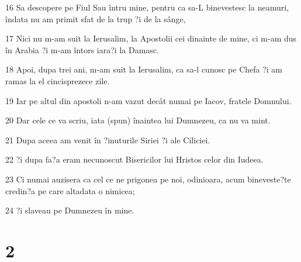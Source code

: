 \par 16 Sa descopere pe Fiul Sau întru mine, pentru ca sa-L binevestesc la neamuri, îndata nu am primit sfat de la trup ?i de la sânge,
\par 17 Nici nu m-am suit la Ierusalim, la Apostolii cei dinainte de mine, ci m-am dus în Arabia ?i m-am întors iara?i la Damasc.
\par 18 Apoi, dupa trei ani, m-am suit la Ierusalim, ca sa-l cunosc pe Chefa ?i am ramas la el cincisprezece zile.
\par 19 Iar pe altul din apostoli n-am vazut decât numai pe Iacov, fratele Domnului.
\par 20 Dar cele ce va scriu, iata (spun) înaintea lui Dumnezeu, ca nu va mint.
\par 21 Dupa aceea am venit în ?inuturile Siriei ?i ale Ciliciei.
\par 22 ?i dupa fa?a eram necunoscut Bisericilor lui Hristos celor din Iudeea.
\par 23 Ci numai auzisera ca cel ce ne prigonea pe noi, odinioara, acum bineveste?te credin?a pe care altadata o nimicea;
\par 24 ?i slaveau pe Dumnezeu în mine.

\chapter{2}

